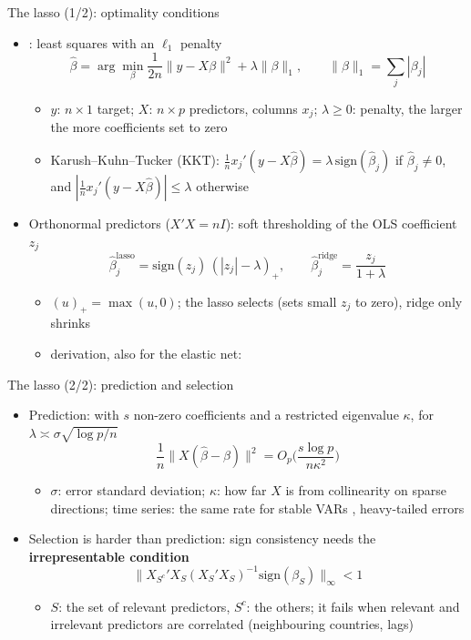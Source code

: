 \begin{frame}{The lasso (1/2): optimality conditions}
\itemsize{\small}
\begin{itemize}
    \item {}: least squares with an $\ell_1$ penalty
    \[ \hat\beta = \arg\min_\beta \frac1{2n}\|y - X\beta\|^2 + \lambda\|\beta\|_1, \qquad \|\beta\|_1 = \sum_j|\beta_j| \]
    \begin{itemize}
        \item $y$: $n \times 1$ target; $X$: $n \times p$ predictors, columns $x_j$; $\lambda \ge 0$: penalty, the larger the more coefficients set to zero
        \item Karush--Kuhn--Tucker (KKT): $\frac1n x_j'(y - X\hat\beta) = \lambda\,\mathrm{sign}(\hat\beta_j)$ if $\hat\beta_j \ne 0$, and $|\frac1n x_j'(y - X\hat\beta)| \le \lambda$ otherwise
    \end{itemize}
    \item Orthonormal predictors ($X'X = nI$): soft thresholding of the OLS coefficient $z_j$
    \[ \hat\beta_j^{\mathrm{lasso}} = \mathrm{sign}(z_j)\,(|z_j| - \lambda)_+, \qquad \hat\beta_j^{\mathrm{ridge}} = \frac{z_j}{1 + \lambda} \]
    \begin{itemize}
        \item $(u)_+ = \max(u, 0)$; the lasso selects (sets small $z_j$ to zero), ridge only shrinks
        \item derivation, also for the elastic net:   %
    \end{itemize}
\end{itemize}
\end{frame}

\begin{frame}{The lasso (2/2): prediction and selection}
\itemsize{\small}
\begin{itemize}
    \item Prediction: with $s$ non-zero coefficients and a restricted eigenvalue $\kappa$, for $\lambda \asymp \sigma\sqrt{\log p/n}$
    \[ \frac1n\|X(\hat\beta - \beta)\|^2 = O_p\Big(\frac{s\log p}{n\kappa^2}\Big) \]
    \begin{itemize}
        \item $\sigma$: error standard deviation; $\kappa$: how far $X$ is from collinearity on sparse directions; time series: the same rate for stable VARs , heavy-tailed errors 
    \end{itemize}
    \item Selection is harder than prediction: sign consistency needs the \textbf{irrepresentable condition} 
    \[ \big\|X_{S^c}'X_S(X_S'X_S)^{-1}\mathrm{sign}(\beta_S)\big\|_\infty < 1 \]
    \begin{itemize}
        \item $S$: the set of relevant predictors, $S^c$: the others; it fails when relevant and irrelevant predictors are correlated (neighbouring countries, lags)
    \end{itemize}
\end{itemize}
\end{frame}

